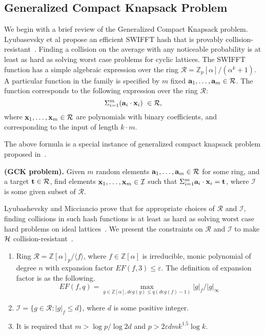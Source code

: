 \subsection{Generalized Compact Knapsack Problem}
We begin with a brief review of the Generalized Compact Knapsack problem. Lyubasevsky et al propose an efficient SWIFFT hash that is provably collision-resistant~\cite{swifft}. Finding a collision on the average with any noticeable probability is at least as hard as solving worst case problems for cyclic lattices. The SWIFFT function has a simple algebraic expression over the ring $\mathcal{R}= \mathbb{Z}_{p}[\alpha]/(\alpha^{k}+1)$. A particular function in the family is specified by $m$ fixed ${{\bf a}_{1},\ldots, {\bf a}_{m}} \in \mathcal{R}$. The function corresponds to the following expression over the ring $\mathcal{R}$:
\[ \Sigma_{i=1}^{m} ({\bf a}_{i} \cdot {\bf x}_{i})   \,\, \in \mathcal{R},\]
where ${\bf x}_{1} ,\ldots, {\bf x}_{m} \in \mathcal{R}$ are polynomials with binary coefficients, and corresponding to the input of length $k \cdot m$.

The above formula is a special instance of generalized compact knapsack problem proposed in~\cite{GCK}. 
\begin{defn}{\bf (GCK problem).}
Given $m$ random elements ${\bf a}_{1},\ldots, {\bf a}_{m} \in \mathcal{R}$ for some ring, and a target ${\bf t} \in \mathcal{R}$, find elements ${\bf x}_{1}, \ldots, {\bf x}_{m} \in \mathcal{I}$ such that $\Sigma_{i=1}^{m} {\bf a}_{i}\cdot {\bf x}_{i} ={\bf t}$, where $\mathcal{I}$ is some given subset of $\mathcal{R}$.
\end{defn}

Lyubashevsky and Micciancio prove that for appropriate choices of $\mathcal{R}$ and $\mathcal{I}$, finding collisions in such hash functions is at least as hard as solving worst case hard problems on ideal lattices~\cite{GCK}. We present the constraints on $\mathcal{R}$ and $\mathcal{I}$ to make $\cal H$ collision-resistant~\cite{GCK}.
\begin{enumerate}
\item Ring $\mathcal{R}= \mathbb{Z}[\alpha]_{p}/\langle f \rangle$, where $f \in \mathbb{Z}[\alpha]$ is irreducible, monic polynomial of degree $n$ with expansion factor $EF(f,3) \leq \varepsilon$. The definition of expansion factor is as the following.
\[ EF(f,q) = \max_{g \in \mathbb{Z}[\alpha], deg(g) \leq q(deg(f)-1)} |g|_{f}/|g|_{\infty}\] \label{CRcon1}
\item $\mathcal{I}=\{g \in \mathcal{R}: |g|_{f} \leq d\}$, where $d$ is some positive integer. \label{CRcon2}
\item It is required that $m > \log p / \log 2d$ and $p > 2 \varepsilon d mk^{1.5} \log k$.\label{CRcon3}
\end{enumerate}

